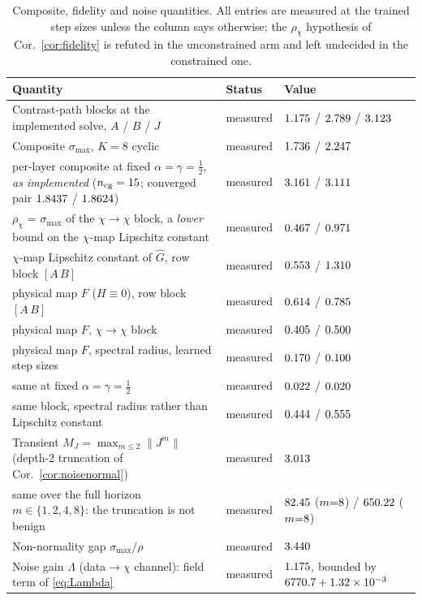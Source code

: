 \documentclass[journal,cmes,article,submit,moreauthors,pdftex]{Definitions/tsp}
\newcommand{\norm}[1]{\lVert #1 \rVert}
\newcommand{\numv}[1]{#1}
\begin{document}
\begin{table}[htbp]
\centering
\caption{Composite, fidelity and noise quantities. All entries are measured at the trained step sizes unless the column says otherwise; the $\rho_\chi$ hypothesis of Cor.~\ref{cor:fidelity} is refuted in the unconstrained arm and left undecided in the constrained one.}
\label{tab:cert2}
\footnotesize\setlength{\tabcolsep}{4pt}
\begin{tabular}{@{}p{}p{}p{}@{}}
\toprule
Quantity & Status & Value \\
\midrule
Contrast-path blocks at the implemented solve, $A$ / $B$ / $J$ & measured & $\numv{\NumSigAImpl}$ / $\numv{\NumSigBImpl}$ / $\numv{\NumSigmaFullImpl}$ \\
Composite $\sigma_{\max}$, $K{=}8$ cyclic & measured & $\numv{\NumSigCompCons}$ / $\numv{\NumSigCompUnc}$ \\
\quad per-layer composite at fixed $\alpha=\gamma=\tfrac12$, \emph{as implemented} ($n_{\mathrm{cg}}=\numv{\NumNCg}$; converged pair $\numv{\NumGdPhysSigmaConv}$ / $\numv{\NumSigCompLayerConsConv}$) & measured & $\numv{\NumSigCompLayerCons}$ / $\numv{\NumSigCompLayerUnc}$ \\
$\rho_\chi$ = $\sigma_{\max}$ of the $\chi\!\to\!\chi$ block, a \emph{lower} bound on the $\chi$-map Lipschitz constant & measured & $\numv{\NumRhoChiCons}$ / $\numv{\NumRhoChiUnc}$ \\
\quad $\chi$-map Lipschitz constant of $\hat G$, row block $[A\,B]$ & measured & $\numv{\NumChiLipRowCons}$ / $\numv{\NumChiLipRowUnc}$ \\
\quad physical map $F$ ($H\equiv0$), row block $[A\,B]$ & measured & $\numv{\NumChiLipRowFCons}$ / $\numv{\NumChiLipRowFUnc}$ \\
\quad physical map $F$, $\chi\!\to\!\chi$ block & measured & $\numv{\NumChiFBlockCons}$ / $\numv{\NumChiFBlockUnc}$ \\
\quad physical map $F$, spectral radius, learned step sizes & measured & $\numv{\NumChiRhoFCons}$ / $\numv{\NumChiRhoFUnc}$ \\
\quad same at fixed $\alpha=\gamma=\tfrac12$ & measured & $\numv{\NumChiRhoFFixCons}$ / $\numv{\NumChiRhoFFixUnc}$ \\
\quad same block, spectral radius rather than Lipschitz constant & measured & $\numv{\NumRhoChiSpecCons}$ / $\numv{\NumRhoChiSpecUnc}$ \\
Transient $M_J=\max_{m\le2}\norm{J^m}$ (depth-2 truncation of Cor.~\ref{cor:noisenormal}) & measured & $\numv{\NumMJCons}$ \\
\quad same over the full horizon $m\in\{1,2,4,8\}$: the truncation is not benign & measured & $\numv{\NumMJFullCons}$ ($m{=}\numv{\NumMJFullArgmaxM}$) / $\numv{\NumMJFullUnc}$ ($m{=}\numv{\NumMJFullArgmaxMUnc}$) \\
Non-normality gap $\sigma_{\max}/\rho$ & measured & $\numv{\NumGapRatio}$ \\
Noise gain $\Lambda$ (data$\to\chi$ channel): field term of \eqref{eq:Lambda} & measured & $\numv{\NumLambdaMeas}$, bounded by $\numv{\NumLambdaBound}+\numv{\NumLamCorrTerm}$ \\
\bottomrule
\end{tabular}
\end{table}
\end{document}
